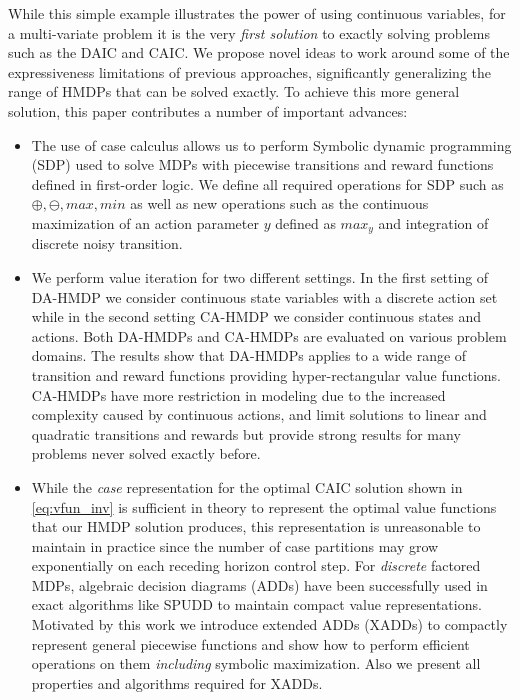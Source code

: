\documentclass[twoside,11pt]{article}
\begin{document}
While this simple example illustrates the power of using continuous variables, for a multi-variate problem it is the very \textit{first solution} to exactly solving problems such as the DAIC and CAIC. 
We propose novel ideas to work around some of the expressiveness limitations of previous approaches, significantly generalizing the range of HMDPs that can be solved exactly.  To achieve this more general solution, this
paper contributes a number of important advances:
\begin{itemize}
\item The use of case calculus allows us to perform Symbolic dynamic programming (SDP) \cite{fomdp} used to solve MDPs with
piecewise transitions and reward functions defined in first-order logic. We define all required operations for SDP such as $\oplus,\ominus,max,min$ as well as new operations such as the continuous maximization of an action parameter $y$ defined as $max_y$ and integration of discrete noisy transition.
\item We perform value iteration for two different settings. In the first setting of DA-HMDP we consider continuous state variables with a discrete action set while in the second setting CA-HMDP we consider continuous states and actions. Both DA-HMDPs and CA-HMDPs are evaluated on various problem domains. The results show that DA-HMDPs applies to a wide range of transition and reward functions providing hyper-rectangular value functions. CA-HMDPs have more restriction in modeling due to the increased complexity caused by continuous actions, and limit solutions to linear and quadratic transitions and rewards but provide strong results for many problems never solved exactly before. 
\item While the \emph{case} representation for the optimal \textsc{CAIC} 
solution shown in \eqref{eq:vfun_inv} is sufficient in theory to
represent the optimal value functions that our HMDP solution
produces, this representation is unreasonable to maintain in practice
since the number of case partitions may grow exponentially on
each receding horizon control step.  For \emph{discrete} factored
MDPs, algebraic decision diagrams (ADDs) \cite{bahar93add} have been
successfully used in exact algorithms like SPUDD \cite{spudd} to
maintain compact value representations.  Motivated by this work we
introduce extended ADDs (XADDs) to compactly represent general
piecewise functions and show how to perform efficient operations on
them \emph{including} symbolic maximization.  Also we present all properties and algorithms required for XADDs. 
\end{itemize}
\end{document}
